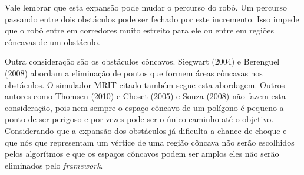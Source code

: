 Vale lembrar que esta expansão pode mudar o percurso do robô. Um percurso passando entre dois obstáculos pode ser fechado por este incremento. Isso impede que o robô entre em corredores muito estreito para ele ou entre em regiões côncavas de um obstáculo.

Outra consideração são os obstáculos côncavos. Siegwart (2004) e Berenguel (2008) abordam a eliminação de pontos que formem áreas côncavas nos obstáculos. O simulador MRIT citado também segue esta abordagem. Outros autores como Thomsen (2010) e Choset (2005) e Souza (2008) não fazem esta consideração, pois nem sempre o espaço côncavo de um polígono é pequeno a ponto de ser perigoso e por vezes pode ser o único caminho até o objetivo. Considerando que a expansão dos obstáculos já dificulta a chance de choque e que nós que representam um vértice de uma região côncava não serão escolhidos pelos algorítmos e que os espaços côncavos podem ser amplos eles não serão eliminados pelo \textit{framework}.